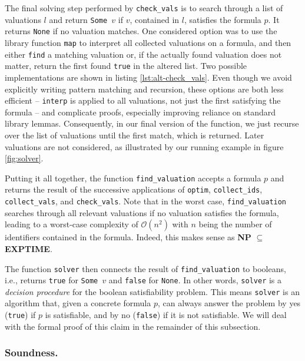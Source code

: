 The final solving step performed by \texttt{check\_vals} is to search through a list of valuations $l$ and return \texttt{Some $v$} if $v$, contained in $l$, satisfies the formula $p$.
It returns \texttt{None} if no valuation matches.
One considered option was to use the library function \texttt{map} to interpret all collected valuations on a formula, and then either \texttt{find} a matching valuation or, if the actually found valuation does not matter, return the first found \texttt{true} in the altered list.
Two possible implementations are shown in listing \ref{lst:alt-check_vals}.
Even though we avoid explicitly writing pattern matching and recursion, these options are both less efficient -- \texttt{interp} is applied to all valuations, not just the first satisfying the formula -- and complicate proofs, especially improving reliance on standard library lemmas.
Consequently, in our final version of the function, we just recurse over the list of valuations until the first match, which is returned.
Later valuations are not considered, as illustrated by our running example in figure \ref{fig:solver}.

Putting it all together, the function \texttt{find\_valuation} accepts a formula $p$ and returns the result of the successive applications of \texttt{optim}, \texttt{collect\_ids}, \texttt{collect\_vals}, and \texttt{check\_vals}.
Note that in the worst case, \texttt{find\_valuation} searches through all relevant valuations if no valuation satisfies the formula, leading to a worst-case complexity of $\mathcal{O}(n^2)$ with $n$ being the number of identifiers contained in the formula.
Indeed, this makes sense as \textbf{NP} $\subseteq$ \textbf{EXPTIME}. %

The function \texttt{solver} then connects the result of \texttt{find\_valuation} to booleans, i.e., returns \texttt{true} for \texttt{Some $v$} and \texttt{false} for \texttt{None}.
In other words, \texttt{solver} is a \emph{decision procedure} \cite{kroening2016decision} for the boolean satisfiability problem.
This means \texttt{solver} is an algorithm that, given a concrete formula $p$, can always answer the problem by yes (\texttt{true}) if $p$ is satisfiable, and by no (\texttt{false}) if it is not satisfiable.
We will deal with the formal proof of this claim in the remainder of this subsection.

\subsubsection{Soundness.}


